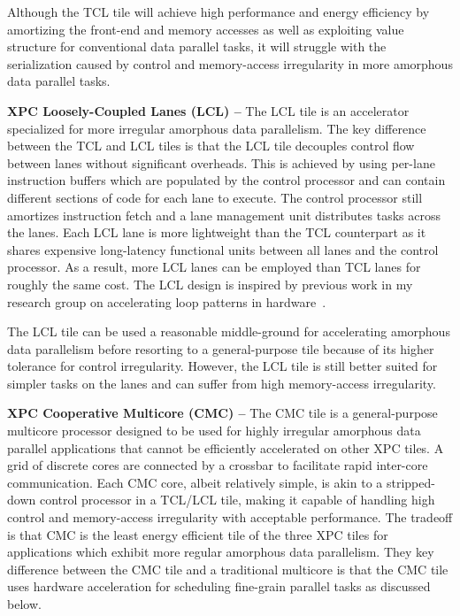 Although the TCL tile will achieve high performance and energy efficiency
by amortizing the front-end and memory accesses as well as exploiting
value structure for conventional data parallel tasks, it will struggle
with the serialization caused by control and memory-access irregularity
in more amorphous data parallel tasks.

\textbf{XPC Loosely-Coupled Lanes (LCL) --} The LCL tile is an
accelerator specialized for more irregular amorphous data
parallelism. The key difference between the TCL and LCL tiles is that the
LCL tile decouples control flow between lanes without significant
overheads. This is achieved by using per-lane instruction buffers which are
populated by the control processor and can contain different sections of
code for each lane to execute. The control processor still amortizes
instruction fetch and a lane management unit distributes tasks across the
lanes. Each LCL lane is more lightweight than the TCL counterpart as it
shares expensive long-latency functional units between all lanes and the
control processor. As a result, more LCL lanes can be employed than TCL
lanes for roughly the same cost. The LCL design is inspired by previous
work in my research group on accelerating loop patterns in
hardware~\cite{srinath-xloops-micro2014}.

The LCL tile can be used a reasonable middle-ground for accelerating
amorphous data parallelism before resorting to a general-purpose tile
because of its higher tolerance for control irregularity. However, the
LCL tile is still better suited for simpler tasks on the lanes and can
suffer from high memory-access irregularity.

\textbf{XPC Cooperative Multicore (CMC) --} The CMC tile is a
general-purpose multicore processor designed to be used for highly
irregular amorphous data parallel applications that cannot be efficiently
accelerated on other XPC tiles. A grid of discrete cores are connected by
a crossbar to facilitate rapid inter-core communication. Each CMC core,
albeit relatively simple, is akin to a stripped-down control processor in
a TCL/LCL tile, making it capable of handling high control and
memory-access irregularity with acceptable performance. The tradeoff is
that CMC is the least energy efficient tile of the three XPC tiles for
applications which exhibit more regular amorphous data parallelism. They
key difference between the CMC tile and a traditional multicore is that
the CMC tile uses hardware acceleration for scheduling fine-grain
parallel tasks as discussed below.


